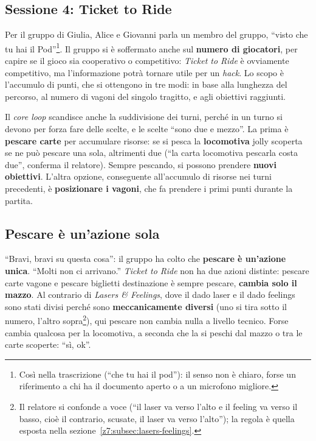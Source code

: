 \subsection{Sessione 4: Ticket to Ride}

Per il gruppo di Giulia, Alice e Giovanni parla un membro del gruppo, ``visto
che tu hai il Pod''\footnote{Così nella trascrizione (``che tu hai il pod''): il
senso non è chiaro, forse un riferimento a chi ha il documento aperto o a un
microfono migliore.}. Il gruppo si è soffermato anche sul \textbf{numero di
giocatori}, per capire se il gioco sia cooperativo o competitivo: \emph{Ticket to
Ride} è ovviamente competitivo, ma l'informazione potrà tornare utile per un
\emph{hack}. Lo scopo è l'accumulo di punti, che si ottengono in tre modi: in
base alla lunghezza del percorso, al numero di vagoni del singolo tragitto, e agli
obiettivi raggiunti.

Il \emph{core loop} scandisce anche la suddivisione dei turni, perché in un turno
si devono per forza fare delle scelte, e le scelte ``sono due e mezzo''. La
prima è \textbf{pescare carte} per accumulare risorse: se si pesca la
\textbf{locomotiva} jolly scoperta se ne può pescare una sola, altrimenti due
(``la carta locomotiva pescarla costa due'', conferma il relatore). Sempre
pescando, si possono prendere \textbf{nuovi obiettivi}. L'altra opzione,
conseguente all'accumulo di risorse nei turni precedenti, è \textbf{posizionare i
vagoni}, che fa prendere i primi punti durante la partita.

\subsection{Pescare è un'azione sola}

``Bravi, bravi su questa cosa'': il gruppo ha colto che \textbf{pescare è
un'azione unica}. ``Molti non ci arrivano.'' \emph{Ticket to Ride} non ha due
azioni distinte: pescare carte vagone e pescare biglietti destinazione è sempre
pescare, \textbf{cambia solo il mazzo}. Al contrario di \emph{Lasers \& Feelings},
dove il dado laser e il dado feelings sono stati divisi perché sono
\textbf{meccanicamente diversi} (uno si tira sotto il numero, l'altro
sopra\footnote{Il relatore si confonde a voce (``il laser va verso l'alto e il
feeling va verso il basso, cioè il contrario, scusate, il laser va verso l'alto'');
la regola è quella esposta nella sezione~\ref{z7:subsec:lasers-feelings}.}),
qui pescare non cambia nulla a livello tecnico. Forse cambia qualcosa per la
locomotiva, a seconda che la si peschi dal mazzo o tra le carte scoperte: ``sì,
ok''.

